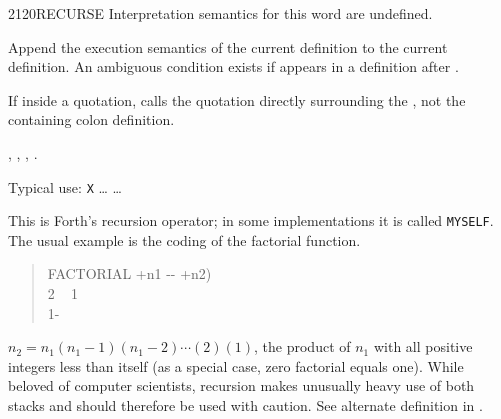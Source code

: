 \begin{worddef}{2120}{RECURSE}
\interpret
	Interpretation semantics for this word are undefined.

\compile
	\stack{}{}

	Append the execution semantics of the current definition to
	the current definition. An ambiguous condition exists if
	 appears in a definition after .

	If inside a quotation, calls the quotation directly surrounding
	the , not the containing colon definition.

\see {},
	,
	\wref{tools:[:}{},
	.

	\begin{rationale} %
		Typical use:
			\word{:} \texttt{X} {\ldots}  {\ldots} \word{;}

		This is Forth's recursion operator; in some implementations it
		is called \texttt{MYSELF}. The usual example is the coding of
		the factorial function.

		\begin{quote}\ttfamily
		\word{:} FACTORIAL  +n1 -{}- +n2) \\
		\tab {} 2  ~
				 1 ~
			 \\
		\tab {} 1- ~~ \word{*} \\
		\word{;}
		\end{quote}

		$n_2 = n_1(n_1-1)(n_1-2)\cdots(2)(1)$, the product of $n_1$
		with all positive integers less than itself (as a special case,
		zero factorial equals one). While beloved of computer scientists,
		recursion makes unusually heavy use of both stacks and should
		therefore be used with caution. See alternate definition in
		.
	\end{rationale}

	\begin{testing} %
		 \\
		 \\
		 \\
		 \\
		 \\


\end{testing}
\end{worddef}
